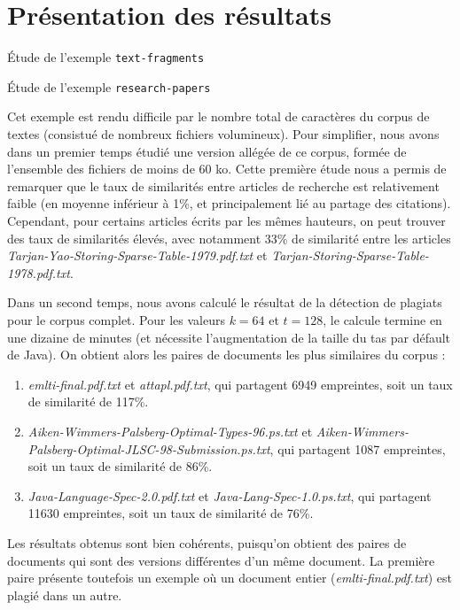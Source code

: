 \documentclass[a4paper,twoside,12pt]{article}
\newcounter{partie}
\newcounter{sous-partie}
\newenvironment{partie}[1]
{
\section{#1}
}
{

}
\newenvironment{sous-partie}[1]
{
\subsection{#1}
}
{

}
\newenvironment{oliste}
{
\vspace{0.2cm}
\begin{enumerate}
}
{
\end{enumerate}
\vspace{0.2cm}
}
\begin{document}
\begin{partie}{Présentation des résultats}
\begin{sous-partie}{Étude de l'exemple \texttt{text-fragments}}
\end{sous-partie}

\begin{sous-partie}{Étude de l'exemple \texttt{research-papers}}

\begin{paragraph}{}
Cet exemple est rendu difficile par le nombre total de caractères du corpus de textes (consistué de nombreux fichiers volumineux). Pour simplifier, nous avons dans un premier temps étudié une version allégée de ce corpus, formée de l'ensemble des fichiers de moins de 60 ko. Cette première étude nous a permis de remarquer que le taux de similarités entre articles de recherche est relativement faible (en moyenne inférieur à 1\%, et principalement lié au partage des citations). Cependant, pour certains articles écrits par les mêmes hauteurs, on peut trouver des taux de similarités élevés, avec notamment 33\% de similarité entre les articles \textit{Tarjan-Yao-Storing-Sparse-Table-1979.pdf.txt} et 
\textit{Tarjan-Storing-Sparse-Table-1978.pdf.txt}.
\end{paragraph}

\begin{paragraph}{}
Dans un second temps, nous avons calculé le résultat de la détection de plagiats pour le corpus complet. Pour les valeurs $k=64$ et $t=128$, le calcule termine en une dizaine de minutes (et nécessite l'augmentation de la taille du tas par défault de Java). On obtient alors les paires de documents les plus similaires du corpus :
\begin{oliste}
\item \textit{emlti-final.pdf.txt} et \textit{attapl.pdf.txt}, qui partagent 6949 empreintes, soit un taux de similarité de 117\%.
\item \textit{Aiken-Wimmers-Palsberg-Optimal-Types-96.ps.txt} et \textit{Aiken-Wimmers-Palsberg-Optimal-JLSC-98-Submission.ps.txt}, qui partagent 1087 empreintes, soit un taux de similarité de 86\%.
\item \textit{Java-Language-Spec-2.0.pdf.txt} et \textit{Java-Lang-Spec-1.0.ps.txt}, qui partagent 11630 empreintes, soit un taux de similarité de 76\%.
\end{oliste}
Les résultats obtenus sont bien cohérents, puisqu'on obtient des paires de documents qui sont des versions différentes d'un même document. La première paire présente toutefois un exemple où un document entier (\textit{emlti-final.pdf.txt}) est plagié dans un autre.
\end{paragraph}

\end{sous-partie}

\end{partie}
\end{document}
